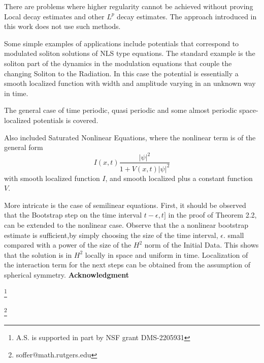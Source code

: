 \documentclass[11pt]{article}
\begin{document}
There are problems where higher regularity cannot be achieved without proving Local decay estimates and other $L^p$ decay estimates.
The approach introduced in this work does not use such methods.


Some simple examples of applications include potentials that correspond to modulated soliton solutions of NLS type equations.
The standard example is the soliton part of the dynamics in the modulation equations that couple the changing Soliton to the Radiation.
In this case the potential is essentially a smooth localized function with width and amplitude varying in an unknown way in time.

The general case of time periodic, quasi periodic and some almost periodic space-localized potentials is covered.

Also included Saturated Nonlinear Equations, where the nonlinear term is of the general form
$$
I(x,t)\frac{|\psi|^2}{1+V(x,t)|\psi|^2}
$$
with smooth localized function $I$, and smooth localized plus a constant function $V.$

More intricate is the case of semilinear equations. First, it should be observed that the Bootstrap step on the time interval $t-\epsilon,t]$ in the proof of Theorem 2.2, can be extended to the nonlinear case.  Observe that the a nonlinear bootstrap estimate is sufficient,by simply choosing the size of the time interval, $\epsilon.$ small compared with a power of the size of the $H^2$ norm of the Initial Data. This shows that the solution is in $H^2$ locally in space and uniform in time. Localization of the interaction term for the next steps can be obtained from the assumption of spherical symmetry.
{\bf Acknowledgment }



\thanks{
A.S. is supported in part by NSF grant DMS-2205931}

\thanks{soffer@math.rutgers.edu}


{}
\end{document}
